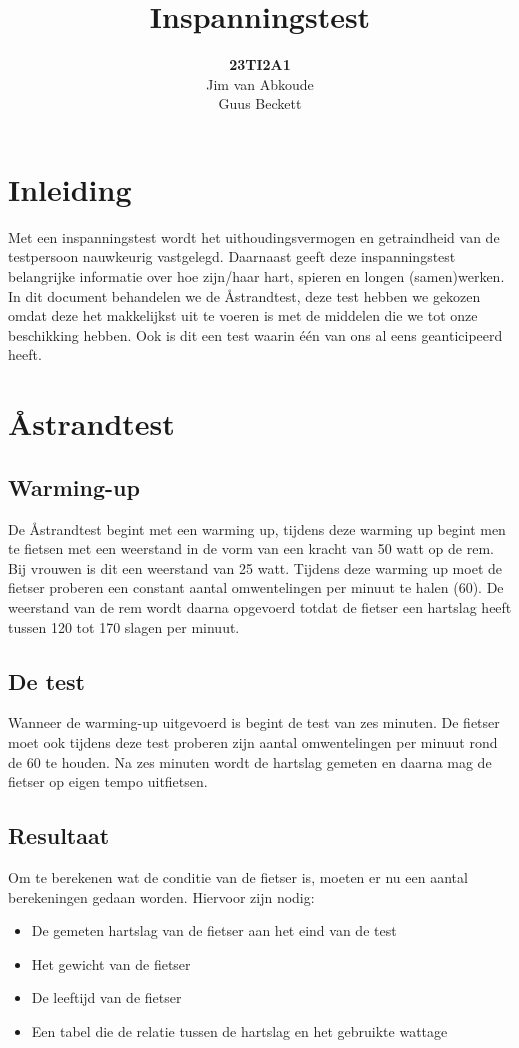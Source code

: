 \documentclass[]{article}
\begin{document}
\title{Inspanningstest}

\author{\textbf{23TI2A1}\\Jim van Abkoude\\Guus Beckett }
\maketitle
\newpage
\tableofcontents
\newpage
\section{Inleiding}
Met een inspanningstest wordt het uithoudingsvermogen en getraindheid van de testpersoon nauwkeurig vastgelegd. Daarnaast geeft deze inspanningstest belangrijke informatie over hoe zijn/haar hart, spieren en longen (samen)werken. In dit document behandelen we de \r{A}strandtest, deze test hebben we gekozen omdat deze het makkelijkst uit te voeren is met de middelen die we tot onze beschikking hebben. Ook is dit een test waarin \'e\'en van ons al eens geanticipeerd heeft.
\newpage
\section{\r{A}strandtest}
\subsection{Warming-up}
De \r{A}strandtest begint met een warming up, tijdens deze warming up begint men te fietsen met een weerstand in de vorm van een kracht van 50 watt op de rem. Bij vrouwen is dit een weerstand van 25 watt. Tijdens deze warming up moet de fietser proberen een constant aantal omwentelingen per minuut te halen (60). De weerstand van de rem wordt daarna opgevoerd totdat de fietser een hartslag heeft tussen 120 tot 170 slagen per minuut.
\subsection{De test}
Wanneer de warming-up uitgevoerd is begint de test van zes minuten. De fietser moet ook tijdens deze test proberen zijn aantal omwentelingen per minuut rond de 60 te houden. Na zes minuten wordt de hartslag gemeten en daarna mag de fietser op eigen tempo uitfietsen.
\subsection{Resultaat}
Om te berekenen wat de conditie van de fietser is, moeten er nu een aantal berekeningen gedaan worden. Hiervoor zijn nodig:
\begin{itemize}
\item De gemeten hartslag van de fietser aan het eind van de test
\item Het gewicht van de fietser
\item De leeftijd van de fietser
\item Een tabel die de relatie tussen de hartslag en het gebruikte wattage
\end{itemize}
\newpage
\end{document}
